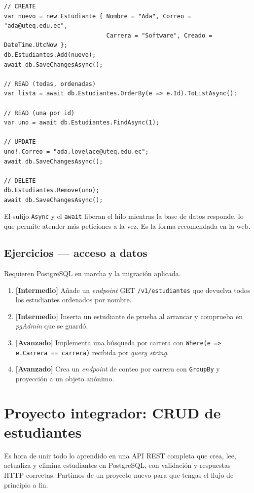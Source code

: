 \documentclass[11pt]{article}
\begin{document}
\begin{cajacodigo}
\begin{lstlisting}[style=cs]
// CREATE
var nuevo = new Estudiante { Nombre = "Ada", Correo = "ada@uteq.edu.ec",
                             Carrera = "Software", Creado = DateTime.UtcNow };
db.Estudiantes.Add(nuevo);
await db.SaveChangesAsync();

// READ (todas, ordenadas)
var lista = await db.Estudiantes.OrderBy(e => e.Id).ToListAsync();

// READ (una por id)
var uno = await db.Estudiantes.FindAsync(1);

// UPDATE
uno!.Correo = "ada.lovelace@uteq.edu.ec";
await db.SaveChangesAsync();

// DELETE
db.Estudiantes.Remove(uno);
await db.SaveChangesAsync();
\end{lstlisting}
\end{cajacodigo}
\vspace{2pt}
El sufijo \texttt{Async} y el \texttt{await} liberan el hilo mientras la base de datos responde, lo que permite atender más peticiones a la vez. Es la forma recomendada en la web.

\subsection{Ejercicios — acceso a datos}
Requieren PostgreSQL en marcha y la migración aplicada.

\begin{enumerate}[leftmargin=1.7em,itemsep=3pt,topsep=2pt]
\item \textbf{[Intermedio]} Añade un \emph{endpoint} GET \texttt{/v1/estudiantes} que devuelva todos los estudiantes ordenados por nombre.
\item \textbf{[Intermedio]} Inserta un estudiante de prueba al arrancar y comprueba en \emph{pgAdmin} que se guardó.
\item \textbf{[Avanzado]} Implementa una búsqueda por carrera con \texttt{Where(e => e.Carrera == carrera)} recibida por \emph{query string}.
\item \textbf{[Avanzado]} Crea un \emph{endpoint} de conteo por carrera con \texttt{GroupBy} y proyección a un objeto anónimo.
\end{enumerate}
\section{Proyecto integrador: CRUD de estudiantes}
Es hora de unir todo lo aprendido en una API REST completa que crea, lee, actualiza y elimina estudiantes en PostgreSQL, con validación y respuestas HTTP correctas. Partimos de un proyecto nuevo para que tengas el flujo de principio a fin.
\end{document}
